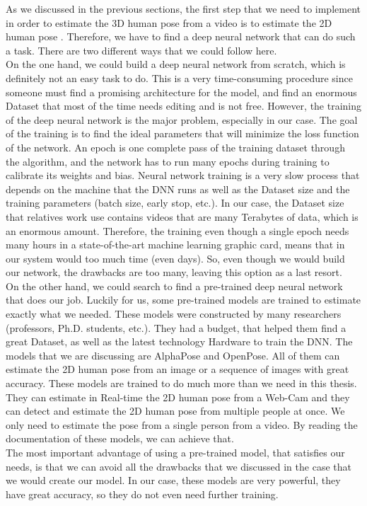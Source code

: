 As we discussed in the previous sections, the first step that we need to implement in order to estimate the 3D human pose from a video is to estimate the 2D human pose \cite{Exploiting temporal information for 3D pose estimation,3D Human Pose Estimation = 2D Pose Estimation + Matching}. Therefore, we have to find a deep neural network that can do such a task. There are two different ways that we could follow here. \\

On the one hand, we could build a deep neural network from scratch, which is definitely not an easy task to do. This is a very time-consuming procedure since someone must find a promising architecture for the model, and find an enormous Dataset that most of the time needs editing and is not free. However, the training of the deep neural network is the major problem, especially in our case. The goal of the training is to find the ideal parameters that will minimize the loss function of the network. An epoch is one complete pass of the training dataset through the algorithm, and the network has to run many epochs during training to calibrate its weights and bias. Neural network training is a very slow process that depends on the machine that the DNN runs as well as the Dataset size and the training parameters (batch size, early stop, etc.). In our case, the Dataset size that relatives work use contains videos that are many Terabytes of data, which is an enormous amount. Therefore, the training even though a single epoch needs many hours in a state-of-the-art machine learning graphic card, means that in our system would too much time (even days). So, even though we would build our network, the drawbacks are too many, leaving this option as a last resort.\\

On the other hand, we could search to find a pre-trained deep neural network that does our job. Luckily for us, some pre-trained models are trained to estimate exactly what we needed. These models were constructed by many researchers (professors, Ph.D. students, etc.). They had a budget, that helped them find a great Dataset, as well as the latest technology Hardware to train the DNN. The models that we are discussing are  AlphaPose and OpenPose. All of them can estimate the 2D human pose from an image or a sequence of images with great accuracy. These models are trained to do much more than we need in this thesis. They can estimate in Real-time the 2D human pose from a Web-Cam and they can detect and estimate the 2D human pose from multiple people at once. We only need to estimate the pose from a single person from a video. By reading the documentation of these models, we can achieve that.\\

The most important advantage of using a pre-trained model, that satisfies our needs, is that we can avoid all the drawbacks that we discussed in the case that we would create our model. In our case, these models are very powerful, they have great accuracy, so they do not even need further training.